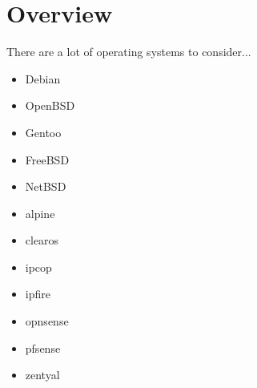 %
%
%
%
%

\section{Overview}
There are a lot of operating systems to consider...

\begin{itemize}
 \item Debian
 \item OpenBSD
 \item Gentoo
 \item FreeBSD
 \item NetBSD
 \item alpine
 \item clearos
 \item ipcop
 \item ipfire
 \item opnsense
 \item pfsense
 \item zentyal
\end{itemize}

